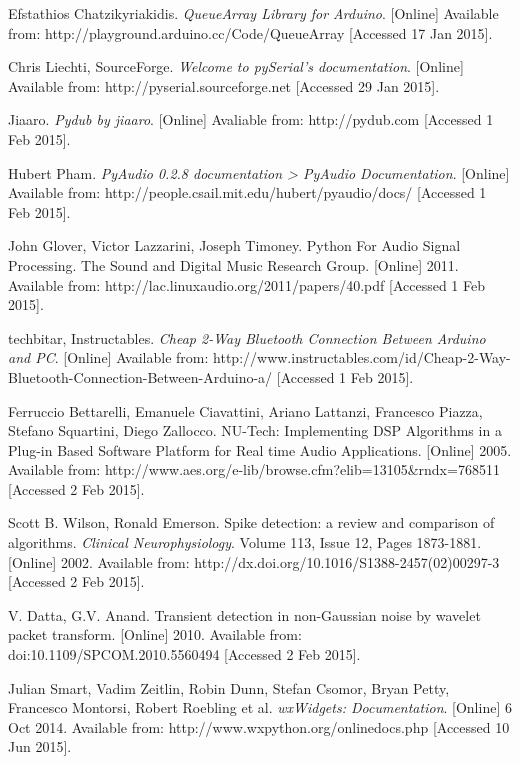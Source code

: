 \begin{thebibliography}{99}

    Efstathios Chatzikyriakidis. \emph{QueueArray Library for Arduino}. [Online] Available from: http://playground.arduino.cc/Code/QueueArray [Accessed 17 Jan 2015].

    Chris Liechti, SourceForge. \emph{Welcome to pySerial's documentation}. [Online] Available from: http://pyserial.sourceforge.net [Accessed 29 Jan 2015].

    Jiaaro. \emph{Pydub by jiaaro}. [Online] Avaliable from: http://pydub.com [Accessed 1 Feb 2015].

    Hubert Pham. \emph{PyAudio 0.2.8 documentation > PyAudio Documentation}. [Online] Available from: http://people.csail.mit.edu/hubert/pyaudio/docs/ [Accessed 1 Feb 2015].
    
    
    John Glover, Victor Lazzarini, Joseph Timoney. Python For Audio Signal Processing. The Sound and Digital Music Research Group. [Online] 2011. Available from: http://lac.linuxaudio.org/2011/papers/40.pdf [Accessed 1 Feb 2015].

    techbitar, Instructables. \emph{Cheap 2-Way Bluetooth Connection Between Arduino and PC}. [Online] Available from: http://www.instructables.com/id/Cheap-2-Way-Bluetooth-Connection-Between-Arduino-a/ [Accessed 1 Feb 2015].

    Ferruccio Bettarelli, Emanuele Ciavattini, Ariano Lattanzi, Francesco Piazza, Stefano Squartini, Diego Zallocco. NU-Tech: Implementing DSP Algorithms in a Plug-in Based Software Platform for Real time Audio Applications. [Online] 2005. Available from: http://www.aes.org/e-lib/browse.cfm?elib=13105\&rndx=768511 [Accessed 2 Feb 2015].

    Scott B. Wilson, Ronald Emerson. Spike detection: a review and comparison of algorithms. \emph{Clinical Neurophysiology}. Volume 113, Issue 12, Pages 1873-1881. [Online] 2002. Available from: http://dx.doi.org/10.1016/S1388-2457(02)00297-3 [Accessed 2 Feb 2015].
    
    V. Datta, G.V. Anand. Transient detection in non-Gaussian noise by wavelet packet transform. [Online] 2010. Available from: doi:10.1109/SPCOM.2010.5560494 [Accessed 2 Feb 2015].

Julian Smart, Vadim Zeitlin, Robin Dunn, Stefan Csomor, Bryan Petty, Francesco Montorsi, Robert Roebling et al. \textit{wxWidgets: Documentation}. [Online] 6 Oct 2014. Available from: http://www.wxpython.org/onlinedocs.php [Accessed 10 Jun 2015].


\end{thebibliography}
